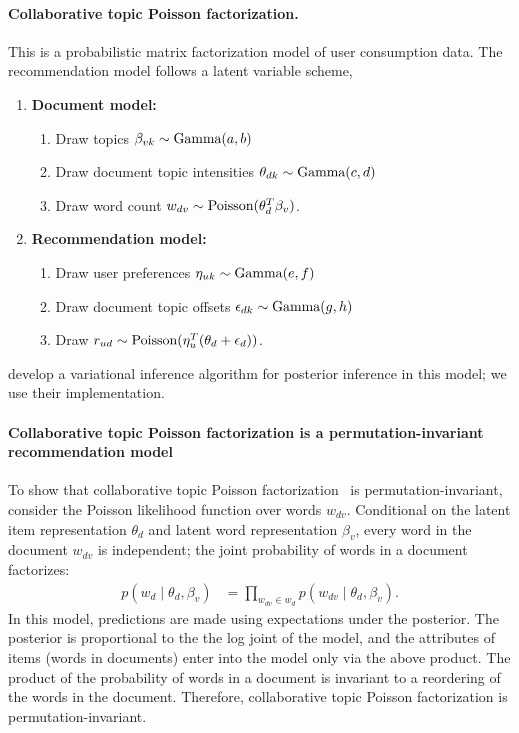 
\paragraph{Collaborative topic Poisson factorization.} This is a probabilistic
matrix factorization model of user consumption data. The recommendation model
follows a latent variable scheme,

\begin{enumerate}
\item {\bf Document model:}
\begin{enumerate}
\item Draw topics $\beta_{vk} \sim \textrm{Gamma}(a, b)$
\item Draw document topic intensities $\theta_{dk} \sim \textrm{Gamma}(c, d)$
\item Draw word count $w_{dv} \sim \textrm{Poisson}(\theta_d^T \beta_v)$.
\end{enumerate}

\item {\bf Recommendation model:}
\begin{enumerate}
\item Draw user preferences $\eta_{uk} \sim \textrm{Gamma}(e, f)$
\item Draw document topic offsets $\epsilon_{dk} \sim \textrm{Gamma}(g, h)$
\item Draw $r_{ud} \sim \textrm{Poisson}(\eta_u^T (\theta_d + \epsilon_d))$.
\end{enumerate}
\end{enumerate}

\citet{gopalan2014content-based} develop a
variational inference algorithm for posterior inference in this model; we use
their implementation.

\paragraph{Collaborative topic Poisson factorization is a permutation-invariant
  recommendation model} To show that collaborative topic Poisson
factorization~\citep{gopalan2014content-based} is permutation-invariant,
consider the Poisson likelihood function over words $w_{dv}$. Conditional on the
latent item representation $\theta_d$ and latent word representation $\beta_v$,
every word in the document $w_{dv}$ is independent; the joint probability of
words in a document factorizes:
\begin{align}
  p(w_{d} \mid \theta_d, \beta_v) &= \prod_{w_{dv} \in w_d} p(w_{dv} \mid \theta_d, \beta_v).
\end{align}
In this model, predictions are made using expectations under the posterior. The
posterior is proportional to the the log joint of the model, and the attributes
of items (words in documents) enter into the model only via the above product.
The product of the probability of words in a document is invariant to a
reordering of the words in the document. Therefore, collaborative topic Poisson
factorization is permutation-invariant.

